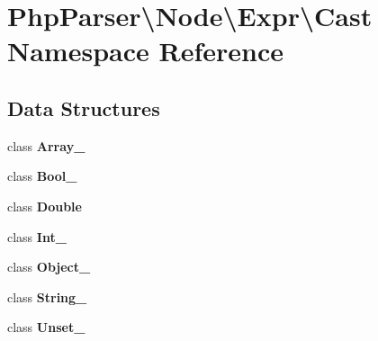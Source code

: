 \section{Php\+Parser\textbackslash{}Node\textbackslash{}Expr\textbackslash{}Cast Namespace Reference}
\label{namespace_php_parser_1_1_node_1_1_expr_1_1_cast}
\subsection*{Data Structures}
\begin{DoxyCompactItemize}
\item 
class {\bf Array\+\_\+}
\item 
class {\bf Bool\+\_\+}
\item 
class {\bf Double}
\item 
class {\bf Int\+\_\+}
\item 
class {\bf Object\+\_\+}
\item 
class {\bf String\+\_\+}
\item 
class {\bf Unset\+\_\+}
\end{DoxyCompactItemize}
